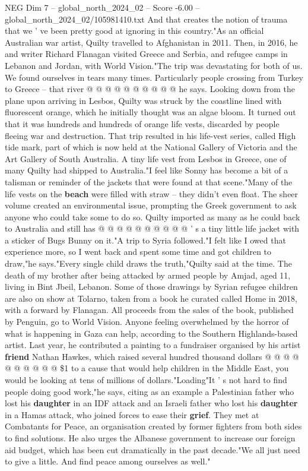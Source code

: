 \begin{textsample}{NEG Dim 7 – global\_north\_2024\_02 – Score -6.00 – global\_north\_2024\_02/105981410.txt}
And that creates the notion of trauma that we ' ve been pretty good at ignoring in this country."As an official Australian war artist, Quilty travelled to Afghanistan in 2011.
Then, in 2016, he and writer Richard Flanagan visited Greece and Serbia, and refugee camps in Lebanon and Jordan, with World Vision."The trip was devastating for both of us.
We found ourselves in tears many times.
Particularly people crossing from Turkey to Greece -- that river @ @ @ @ @ @ @ @ @ @ he says.
Looking down from the plane upon arriving in Lesbos, Quilty was struck by the coastline lined with fluorescent orange, which he initially thought was an algae bloom.
It turned out that it was hundreds and hundreds of orange life vests, discarded by people fleeing war and destruction.
That trip resulted in his life-vest series, called High tide mark, part of which is now held at the National Gallery of Victoria and the Art Gallery of South Australia.
A tiny life vest from Lesbos in Greece, one of many Quilty had shipped to Australia."I feel like Sonny has become a bit of a talisman or reminder of the jackets that were found at that scene."Many of the life vests on the \textbf{beach} were filled with straw -- they didn't even float.
The sheer volume created an environmental issue, prompting the Greek government to ask anyone who could take some to do so.
Quilty imported as many as he could back to Australia and still has @ @ @ @ @ @ @ @ @ @ ' s a tiny little life jacket with a sticker of Bugs Bunny on it."A trip to Syria followed."I felt like I owed that experience more, so I went back and spent some time and got children to draw,"he says."Every single child draws the truth,"Quilty said at the time.
The death of my brother after being attacked by armed people by Amjad, aged 11, living in Bint Jbeil, Lebanon.
Some of those drawings by Syrian refugee children are also on show at Tolarno, taken from a book he curated called Home in 2018, with a forward by Flanagan.
All proceeds from the sales of the book, published by Penguin, go to World Vision.
Anyone feeling overwhelmed by the horror of what is happening in Gaza can help, according to the Southern Highlands-based artist.
Last year, he contributed a painting to a fundraiser organised by his artist \textbf{friend} Nathan Hawkes, which raised several hundred thousand dollars @ @ @ @ @ @ @ @ @ @ \$1 to a cause that would help children in the Middle East, you would be looking at tens of millions of dollars."Loading"It ' s not hard to find people doing good work,"he says, citing as an example a Palestinian father who lost his \textbf{daughter} in an IDF attack and an Israeli father who lost his \textbf{daughter} in a Hamas attack, who joined forces to ease their \textbf{grief}.
They met at Combatants for Peace, an organisation created by former fighters from both sides to find solutions.
He also urges the Albanese government to increase our foreign aid budget, which has been cut dramatically in the past decade."We all just need to give a little.
And find peace among ourselves as well."

\end{textsample}
